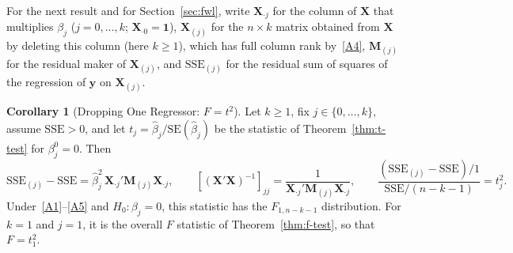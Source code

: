 \documentclass[12pt,a4paper]{article}
\theoremstyle{definition}
\newtheorem{corollary}[theorem]{Corollary}
\newcommand{\SSE}{\mathrm{SSE}}
\newcommand{\SE}{\mathrm{SE}}
\newcommand{\bX}{\mathbf{X}}
\newcommand{\by}{\mathbf{y}}
\newcommand{\bM}{\mathbf{M}}
\newcommand{\bone}{\mathbf{1}}
\begin{document}
For the next result and for Section~\ref{sec:fwl}, write $\bX_{\cdot j}$ for the column of $\bX$ that multiplies $\beta_j$ ($j = 0, \ldots, k$; $\bX_{\cdot 0} = \bone$), $\bX_{(j)}$ for the $n \times k$ matrix obtained from $\bX$ by deleting this column (here $k \geqslant 1$), which has full column rank by~\ref{A4}, $\bM_{(j)}$ for the residual maker of $\bX_{(j)}$, and $\SSE_{(j)}$ for the residual sum of squares of the regression of $\by$ on $\bX_{(j)}$.

\begin{corollary}[Dropping One Regressor: $F = t^2$]\label{cor:drop-one}
Let $k \geqslant 1$, fix $j \in \{0, \ldots, k\}$, assume $\SSE > 0$, and let $t_j = \hat\beta_j/\SE(\hat\beta_j)$ be the statistic of Theorem~\ref{thm:t-test} for $\beta_j^0 = 0$. Then
\[
\SSE_{(j)} - \SSE = \hat\beta_j^2\,\bX_{\cdot j}'\bM_{(j)}\bX_{\cdot j}, \qquad [(\bX'\bX)^{-1}]_{jj} = \frac{1}{\bX_{\cdot j}'\bM_{(j)}\bX_{\cdot j}}, \qquad \frac{(\SSE_{(j)} - \SSE)/1}{\SSE/(n-k-1)} = t_j^2.
\]
Under~\ref{A1}--\ref{A5} and $H_0\colon \beta_j = 0$, this statistic has the $F_{1,n-k-1}$ distribution. For $k = 1$ and $j = 1$, it is the overall $F$ statistic of Theorem~\ref{thm:f-test}, so that $F = t_1^2$.
\end{corollary}
\end{document}
